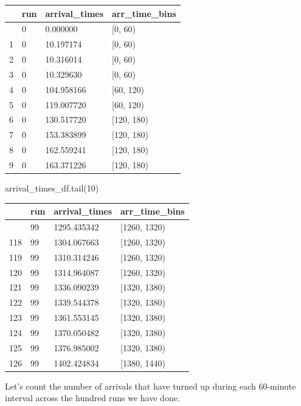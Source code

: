 \documentclass[
  letterpaper,
  DIV=11,
  numbers=noendperiod]{scrreprt}
\newenvironment{Shaded}{\begin{snugshade}}{\end{snugshade}}
\newcommand{\DecValTok}[1]{\textcolor[rgb]{0.68,0.00,0.00}{#1}}
\newcommand{\NormalTok}[1]{\textcolor[rgb]{0.00,0.23,0.31}{#1}}
\begin{document}
\begin{longtable}[]{@{}llll@{}}
\toprule\noalign{}
& run & arrival\_times & arr\_time\_bins \\
\midrule\noalign{}
\endhead
\bottomrule\noalign{}
\endlastfoot
0 & 0 & 0.000000 & {[}0, 60) \\
1 & 0 & 10.197174 & {[}0, 60) \\
2 & 0 & 10.316014 & {[}0, 60) \\
3 & 0 & 10.329630 & {[}0, 60) \\
4 & 0 & 104.958166 & {[}60, 120) \\
5 & 0 & 119.007720 & {[}60, 120) \\
6 & 0 & 130.517720 & {[}120, 180) \\
7 & 0 & 153.383899 & {[}120, 180) \\
8 & 0 & 162.559241 & {[}120, 180) \\
9 & 0 & 163.371226 & {[}120, 180) \\
\end{longtable}

\begin{Shaded}
\begin{Highlighting}[]
\NormalTok{arrival\_times\_df.tail(}\DecValTok{10}\NormalTok{)}
\end{Highlighting}
\end{Shaded}

\begin{longtable}[]{@{}llll@{}}
\toprule\noalign{}
& run & arrival\_times & arr\_time\_bins \\
\midrule\noalign{}
\endhead
\bottomrule\noalign{}
\endlastfoot
117 & 99 & 1295.435342 & {[}1260, 1320) \\
118 & 99 & 1304.067663 & {[}1260, 1320) \\
119 & 99 & 1310.314246 & {[}1260, 1320) \\
120 & 99 & 1314.964087 & {[}1260, 1320) \\
121 & 99 & 1336.090239 & {[}1320, 1380) \\
122 & 99 & 1339.544378 & {[}1320, 1380) \\
123 & 99 & 1361.553145 & {[}1320, 1380) \\
124 & 99 & 1370.050482 & {[}1320, 1380) \\
125 & 99 & 1376.985002 & {[}1320, 1380) \\
126 & 99 & 1402.424834 & {[}1380, 1440) \\
\end{longtable}

Let's count the number of arrivals that have turned up during each
60-minute interval across the hundred runs we have done.
\end{document}
